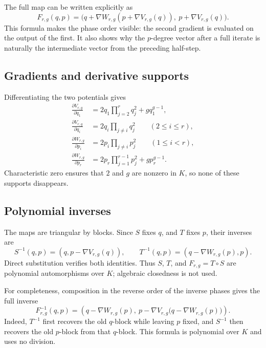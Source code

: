 \documentclass[11pt]{article}
\theoremstyle{remark}
\numberwithin{equation}{section}
\begin{document}
The full map can be written explicitly as
\[
F_{r,g}(q,p)=
\bigl(q+\nabla W_{r,g}(p+\nabla V_{r,g}(q)),
\ p+\nabla V_{r,g}(q)\bigr).
\]
This formula makes the phase order visible: the second gradient is evaluated
on the output of the first.  It also shows why the \(p\)-degree vector after
a full iterate is naturally the intermediate vector from the preceding
half-step.

\subsection{Gradients and derivative supports}

Differentiating the two potentials gives
\begin{align}
\frac{\partial V_{r,g}}{\partial q_1}
&=2q_1\prod_{j=2}^{r}q_j^2+gq_1^{g-1},
\label{eq:grad-V-first}\\
\frac{\partial V_{r,g}}{\partial q_i}
&=2q_i\prod_{j\neq i}q_j^2
\qquad(2\leq i\leq r),
\label{eq:grad-V-middle}\\
\frac{\partial W_{r,g}}{\partial p_i}
&=2p_i\prod_{j\neq i}p_j^2
\qquad(1\leq i<r),
\label{eq:grad-W-middle}\\
\frac{\partial W_{r,g}}{\partial p_r}
&=2p_r\prod_{j=1}^{r-1}p_j^2+gp_r^{g-1}.
\label{eq:grad-W-last}
\end{align}
Characteristic zero ensures that \(2\) and \(g\) are nonzero in \(K\), so
none of these supports disappears.

\subsection{Polynomial inverses}

The maps are triangular by blocks.  Since \(S\) fixes \(q\), and \(T\)
fixes \(p\), their inverses are
\begin{equation}\label{eq:inverses}
S^{-1}(q,p)=(q,p-\nabla V_{r,g}(q)),
\qquad
T^{-1}(q,p)=(q-\nabla W_{r,g}(p),p).
\end{equation}
Direct substitution verifies both identities.  Thus \(S\), \(T\), and
\(F_{r,g}=T\circ S\) are polynomial automorphisms over \(K\); algebraic
closedness is not used.

For completeness, composition in the reverse order of the inverse phases
gives the full inverse
\begin{equation}\label{eq:full-inverse}
F_{r,g}^{-1}(q,p)
=
\left(
q-\nabla W_{r,g}(p),\
p-\nabla V_{r,g}\bigl(q-\nabla W_{r,g}(p)\bigr)
\right).
\end{equation}
Indeed, \(T^{-1}\) first recovers the old \(q\)-block while leaving \(p\)
fixed, and \(S^{-1}\) then recovers the old \(p\)-block from that
\(q\)-block.  This formula is polynomial over \(K\) and uses no division.
\end{document}
